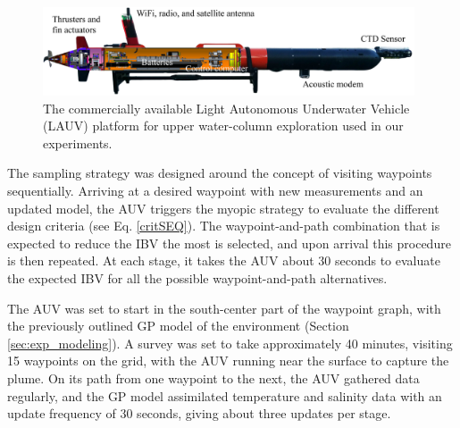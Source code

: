 \documentclass[aoas]{imsart}
\begin{document}
\begin{figure}[!h] 
\centering 
\includegraphics[width=0.98\textwidth]{Figures/harald.jpg}
\caption{The commercially available Light Autonomous Underwater
  Vehicle (LAUV) platform for upper water-column exploration used in
  our experiments.}
\label{fig:lauv}
\end{figure} 

The sampling strategy was designed around the concept of visiting
waypoints sequentially. Arriving at a desired waypoint with new
measurements and an updated model, the AUV triggers the myopic
strategy to evaluate the different design criteria (see
Eq. \eqref{critSEQ}). The waypoint-and-path combination that is
expected to reduce the IBV the most is selected, and upon arrival this
procedure is then repeated. At each stage, it takes the AUV about 30
seconds to evaluate the expected IBV for all the possible
waypoint-and-path alternatives.

The AUV was set to start in the south-center part of the waypoint
graph, with the previously outlined GP model of the environment (Section \ref{sec:exp_modeling}). A
survey was set to take approximately 40 minutes, visiting 15 waypoints
on the grid, with the AUV running near the surface to capture the
plume. On its path from one waypoint to the next, the AUV gathered
data regularly, and the GP model assimilated temperature and salinity
data with an update frequency of 30 seconds, giving about three updates
per stage.
\end{document}
